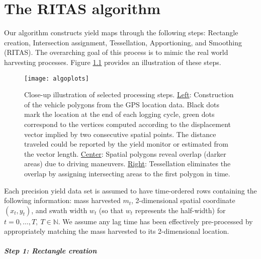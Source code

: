 \chapter{The RITAS algorithm}
\label{sec:ritas}

Our algorithm constructs yield maps through the following steps:
Rectangle creation, Intersection assignment, Tessellation,
Apportioning, and Smoothing (RITAS). The overarching goal of this
process is to mimic the real world harvesting processes. Figure
\ref{fig:closeup} provides an illustration of these steps.

\begin{figure}[h!]  \centering
  \texttt{[image: algoplots]}
  \caption[Close-up illustration of selected algorithm steps]{Close-up
    illustration of selected processing steps. \underline{Left}:
    Construction of the vehicle polygons from the GPS location
    data. Black dots mark the location at the end of each logging
    cycle, green dots correspond to the vertices computed according to
    the displacement vector implied by two consecutive spatial
    points. The distance traveled could be reported by the yield
    monitor or estimated from the vector length. \underline{Center}:
    Spatial polygons reveal overlap (darker areas) due to driving
    maneuvers. \underline{Right}: Tessellation eliminates the overlap
    by assigning intersecting areas to the first polygon in time.}
    \label{fig:closeup}
\end{figure}

Each precision yield data set is assumed to have time-ordered rows
containing the following information: mass harvested $m_t$,
2-dimensional spatial coordinate $(x_t,y_t)$, and swath width $w_t$
(so that $w_t$ represents the half-width) for
$t=0,\ldots,T, \ T \in \mathbb{N}$.  We assume any lag time has been
effectively pre-processed by appropriately matching the mass harvested
to its 2-dimensional location.

\paragraph*{Step 1: Rectangle creation}

